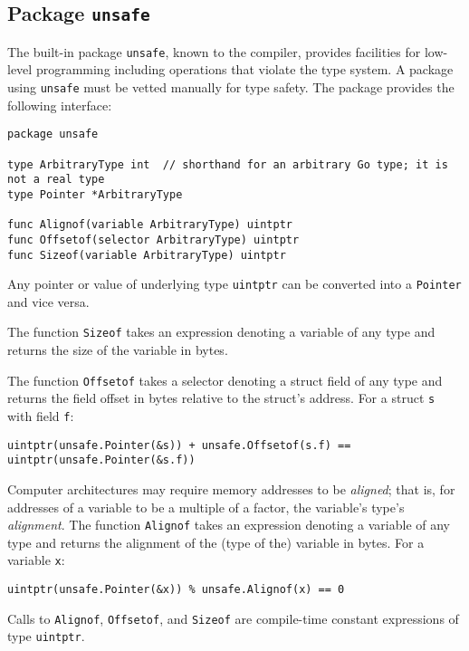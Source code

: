 \subsection*{Package \texttt{unsafe}}

The built-in package \texttt{unsafe}, known to the compiler, provides
facilities for low-level programming including operations that violate
the type system. A package using \texttt{unsafe} must be vetted manually
for type safety. The package provides the following interface:

\begin{Verbatim}[frame=single]
package unsafe

type ArbitraryType int  // shorthand for an arbitrary Go type; it is not a real type
type Pointer *ArbitraryType

func Alignof(variable ArbitraryType) uintptr
func Offsetof(selector ArbitraryType) uintptr
func Sizeof(variable ArbitraryType) uintptr
\end{Verbatim}

Any pointer or value of underlying type
\texttt{uintptr} can be converted into a \texttt{Pointer} and vice
versa.

The function \texttt{Sizeof} takes an expression denoting a variable of
any type and returns the size of the variable in bytes.

The function \texttt{Offsetof} takes a selector denoting a struct
field of any type and returns the field offset in bytes relative
to the struct's address.  For a struct \texttt{s} with field
\texttt{f}:

\begin{Verbatim}[frame=single]
uintptr(unsafe.Pointer(&s)) + unsafe.Offsetof(s.f) == uintptr(unsafe.Pointer(&s.f))
\end{Verbatim}

Computer architectures may require memory addresses to be
\emph{aligned}; that is, for addresses of a variable to be a multiple of
a factor, the variable's type's \emph{alignment}. The function
\texttt{Alignof} takes an expression denoting a variable of any type and
returns the alignment of the (type of the) variable in bytes. For a
variable \texttt{x}:

\begin{Verbatim}[frame=single]
uintptr(unsafe.Pointer(&x)) % unsafe.Alignof(x) == 0
\end{Verbatim}

Calls to \texttt{Alignof}, \texttt{Offsetof}, and \texttt{Sizeof} are
compile-time constant expressions of type \texttt{uintptr}.

